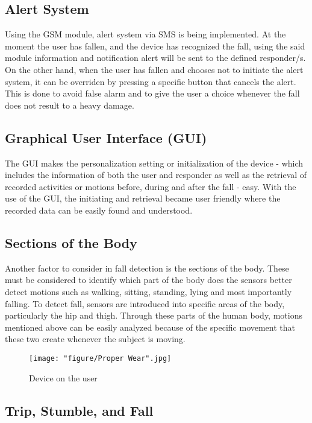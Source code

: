 \subsection{Alert System}

Using the GSM module, alert system via SMS is being implemented. At the moment the user has fallen, and the device has recognized the fall, using the said module  information and notification alert will be sent to the defined responder/s. On the other hand, when the user has fallen and chooses not to initiate the alert system, it can be overriden by pressing a specific button that cancels the alert. This is done to avoid false alarm and to give the user a choice whenever the fall does not result to a heavy damage.

\subsection{Graphical User Interface (GUI)}

The GUI makes the personalization setting or initialization of the device - which includes the information of both the user and responder as well as the retrieval of recorded activities or motions before, during and after the fall - easy. With the use of the GUI, the initiating and retrieval became user friendly where the recorded data can be easily found and understood.

\subsection{Sections of the Body}

Another factor to consider in fall detection is the sections of the body. These must be considered to identify which part of the body does the sensors better detect motions such as walking, sitting, standing, lying and most importantly falling. To detect fall, sensors are introduced into specific areas of the body, particularly the hip and thigh. Through these parts of the human body, motions mentioned above can be easily analyzed because of the specific movement that these two create whenever the subject is moving.

\begin{figure}[htbp]
	\centering
		\texttt{[image: "figure/Proper Wear".jpg]}
	\caption{Device on the user}
	\label{fig:Proper Wear}
\end{figure}

\subsection{Trip, Stumble, and Fall}

